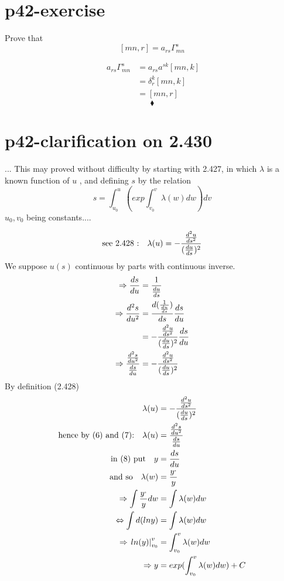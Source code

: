 \section{p42-exercise}
\begin{tcolorbox}
Prove that  $$ [mn,r] = a_{rs}\Gamma^s_{mn}$$
\end{tcolorbox}
\begin{align}
\ a_{rs}\Gamma^s_{mn} & = a_{rs}a^{sk}[mn,k]\\
\ & = \delta^k_r[mn,k]\\
\ &= [mn,r]
\end{align}
$$\blacklozenge$$
\newpage

\section{p42-clarification on 2.430}
\begin{tcolorbox}
... This may proved without difficulty by starting with 2.427, in which $\lambda$ is a known function of $u$ , and defining $s$ by the relation$$ s = \int^u_{u_0}(exp\int^v_{v_0} \lambda(w)dw)dv$$ $u_0, v_0$ being constants....
\end{tcolorbox}
\begin{align}
\text{see 2.428 :} \quad  \lambda (u)=-\frac{\dv[2]{u}{s}}{(\dv{u}{s})^2}\\
\end{align}
We suppose $u(s)$ continuous by parts with continuous inverse.
\begin{align}
\Rightarrow \dv{s}{u} &= \frac{1}{\dv{u}{s}}\\
\Rightarrow \dv[2]{s}{u}&= \dv{(\frac{1}{\dv{u}{s}})}{s}\dv{s}{u}\\
\ & = -\frac{\dv[2]{u}{s}}{(\dv{u}{s})^2}\dv{s}{u}\\
\Rightarrow \frac{\dv[2]{s}{u}}{\dv{s}{u}} &= - \frac{\dv[2]{u}{s}}{(\dv{u}{s})^2}  
\end{align}
By definition (2.428)
\begin{align}
\ \lambda (u) &= - \frac{\dv[2]{u}{s}}{(\dv{u}{s})^2}\\
\text{hence by (6) and (7):}\quad  \lambda (u) &= \frac{\dv[2]{s}{u}}{\dv{s}{u}}\\
\text{in (8) put}\quad y &= \dv{s}{u} \\
\text{ and so} \quad \lambda (w)  &= \frac{y^,}{y}\\
\Rightarrow \int \frac{y^,}{y}dw &= \int \lambda (w)dw\\
\Leftrightarrow \int d(lny) &= \int \lambda (w)dw\\
\Rightarrow \left. ln(y) \right|^v_{v_0} &= \int^v_{v_0} \lambda (w)dw\\
\Rightarrow y  &= exp(\int^v_{v_0} \lambda (w)dw) + C
\end{align}
